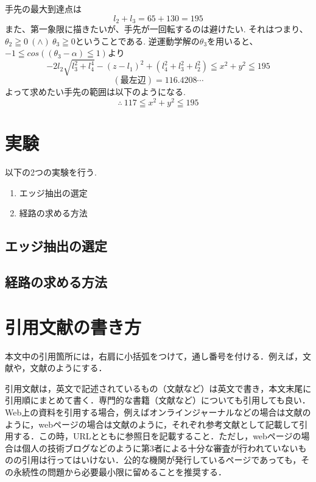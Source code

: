 \documentclass[10pt]{jarticle}
\begin{document}
	手先の最大到達点は
	\begin{equation*}
		l_2+l_3  =  65+130  =  195
	\end{equation*}
	また、第一象限に描きたいが、手先が一回転するのは避けたい.
	それはつまり、$  \theta_2  \geqq  0\  (\land)  \  \theta_3  \geqq0$ということである.
	逆運動学解の$\theta_3$を用いると、$  -1  \leqq  cos((\theta_3  -  \alpha)  \leqq  1)$より
	\begin{equation*}
		-2l_2\sqrt{l_3^2+l_4^4}  - (z-l_1)^2  +  (l_4^2  +  l_3^2  +  l_2^2)  \leqq  x^2  +  y^2  \leqq  195
	\end{equation*}
	$$
		(\text{最左辺})  =  116.4208  \cdots
	$$
	よって求めたい手先の範囲は以下のようになる.
	\begin{equation*}
		\therefore\  117  \leqq  x^2  +  y^2  \leqq  195
	\end{equation*}


	\section{実験}

	以下の2つの実験を行う.
	
	\begin{enumerate}
		\item エッジ抽出の選定
		\item 経路の求める方法
	\end{enumerate}

	
	\subsection{エッジ抽出の選定}



	\subsection{経路の求める方法}

    
    \section{引用文献の書き方}%
    本文中の引用箇所には，右肩に小括弧をつけて，通し番号を付ける．例えば，文献\cite{工大2005}や，文献\cite{Shibutani2004, Handbook1979, Kikuchi2017, Adrobo2019}のようにする．
    
    引用文献は，英文で記述されているもの（文献\cite{Shibutani2004}など）は英文で書き，本文末尾に引用順にまとめて書く．専門的な書籍（文献\cite{Handbook1979}など）についても引用しても良い．
    Web上の資料を引用する場合，例えばオンラインジャーナルなどの場合は文献\cite{Kikuchi2017}のように，webページの場合は文献\cite{Adrobo2019}のように，それぞれ参考文献として記載して引用する．この時，URLとともに参照日を記載すること．ただし，webページの場合は個人の技術ブログなどのように第3者による十分な審査が行われていないものの引用は行ってはいけない．公的な機関が発行しているページであっても，その永続性の問題から必要最小限に留めることを推奨する．
        
\end{document}
